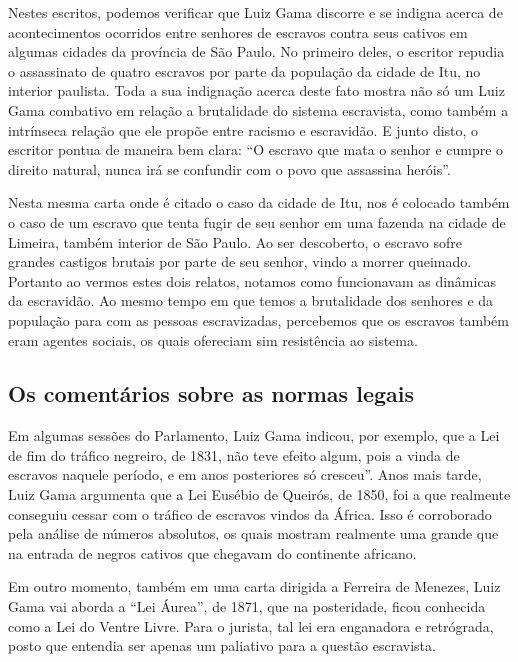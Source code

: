 \documentclass[12pt]{extarticle}
\begin{document}






Nestes escritos, podemos verificar que Luiz Gama discorre e se indigna
acerca de acontecimentos ocorridos entre senhores de escravos contra
seus cativos em algumas cidades da província de São Paulo. No primeiro
deles, o escritor repudia o assassinato de quatro escravos por parte da
população da cidade de Itu, no interior paulista. Toda a sua indignação
acerca deste fato mostra não só um Luiz Gama combativo em relação a
brutalidade do sistema escravista, como também a intrínseca relação que
ele propõe entre racismo e escravidão. E junto disto, o escritor pontua
de maneira bem clara: ``O escravo que mata o senhor e cumpre o direito
natural, nunca irá se confundir com o povo que assassina heróis''.

Nesta mesma carta onde é citado o caso da cidade de Itu, nos é colocado
também o caso de um escravo que tenta fugir de seu senhor em uma fazenda
na cidade de Limeira, também interior de São Paulo. Ao ser descoberto, o
escravo sofre grandes castigos brutais por parte de seu senhor, vindo a
morrer queimado. Portanto ao vermos estes dois relatos, notamos como
funcionavam as dinâmicas da escravidão. Ao mesmo tempo em que temos a
brutalidade dos senhores e da população para com as pessoas
escravizadas, percebemos que os escravos também eram agentes sociais, os
quais ofereciam sim resistência ao sistema.

\subsection{Os comentários sobre as normas legais}

Em algumas sessões do Parlamento, Luiz Gama indicou, por exemplo, que a
Lei de fim do tráfico negreiro, de 1831, não teve efeito algum, pois a
vinda de escravos naquele período, e em anos posteriores só cresceu''.
Anos mais tarde, Luiz Gama argumenta que a Lei Eusébio de Queirós, de
1850, foi a que realmente conseguiu cessar com o tráfico de escravos
vindos da África. Isso é corroborado pela análise de números absolutos,
os quais mostram realmente uma grande que na entrada de negros cativos
que chegavam do continente africano.

Em outro momento, também em uma carta dirigida a Ferreira de Menezes,
Luiz Gama vai aborda a ``Lei Áurea'', de 1871, que na posteridade, ficou
conhecida como a Lei do Ventre Livre. Para o jurista, tal lei era
enganadora e retrógrada, posto que entendia ser apenas um paliativo para
a questão escravista.
\end{document}
